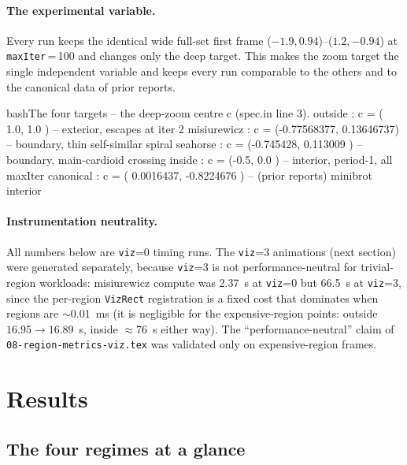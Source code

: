 \documentclass[
	english,
	letterpaper, oneside
]{article}
\begin{document}
\paragraph{The experimental variable.} Every run keeps the identical wide
full-set first frame ($-1.9,0.94$)--($1.2,-0.94$) at \texttt{maxIter}\,=\,100 and
changes only the deep target. This makes the zoom target the single
independent variable and keeps every run comparable to the others and to the
canonical data of prior reports.

\begin{sourcecode}{bash}{The four targets -- the deep-zoom centre c (spec.in line 3).}
outside     : c = ( 1.0,        1.0       )   -- exterior, escapes at iter 2
misiurewicz : c = (-0.77568377, 0.13646737)   -- boundary, thin self-similar spiral
seahorse    : c = (-0.745428,   0.113009  )   -- boundary, main-cardioid crossing
inside      : c = (-0.5,        0.0       )   -- interior, period-1, all maxIter
canonical   : c = ( 0.0016437, -0.8224676 )   -- (prior reports) minibrot interior
\end{sourcecode}

\paragraph{Instrumentation neutrality.} All numbers below are \texttt{viz}=0
timing runs. The \texttt{viz}=3 animations (next section) were generated
separately, because \texttt{viz}=3 is not performance-neutral for
trivial-region workloads: misiurewicz compute was 2.37~s at \texttt{viz}=0 but
66.5~s at \texttt{viz}=3, since the per-region \texttt{VizRect}
registration is a fixed cost that dominates when regions are $\sim$0.01~ms (it is
negligible for the expensive-region points: outside $16.95\to16.89$~s, inside
$\approx$76~s either way). The ``performance-neutral'' claim of
\texttt{08-region-metrics-viz.tex} was validated only on expensive-region frames.

\section{Results}

\subsection{The four regimes at a glance}
\end{document}
